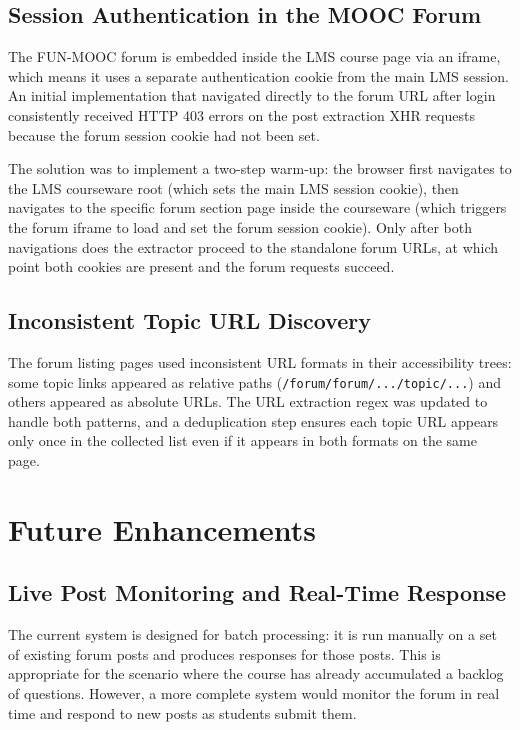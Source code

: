 \documentclass[12pt, a4paper]{article}
\begin{document}
\subsection{Session Authentication in the MOOC Forum}

The FUN-MOOC forum is embedded inside the LMS course page via an iframe, which means it uses a separate authentication cookie from the main LMS session. An initial implementation that navigated directly to the forum URL after login consistently received HTTP 403 errors on the post extraction XHR requests because the forum session cookie had not been set.

The solution was to implement a two-step warm-up: the browser first navigates to the LMS courseware root (which sets the main LMS session cookie), then navigates to the specific forum section page inside the courseware (which triggers the forum iframe to load and set the forum session cookie). Only after both navigations does the extractor proceed to the standalone forum URLs, at which point both cookies are present and the forum requests succeed.

\subsection{Inconsistent Topic URL Discovery}

The forum listing pages used inconsistent URL formats in their accessibility trees: some topic links appeared as relative paths (\texttt{/forum/forum/.../topic/...}) and others appeared as absolute URLs. The URL extraction regex was updated to handle both patterns, and a deduplication step ensures each topic URL appears only once in the collected list even if it appears in both formats on the same page.

\section{Future Enhancements}

\subsection{Live Post Monitoring and Real-Time Response}

The current system is designed for batch processing: it is run manually on a set of existing forum posts and produces responses for those posts. This is appropriate for the scenario where the course has already accumulated a backlog of questions. However, a more complete system would monitor the forum in real time and respond to new posts as students submit them.
\end{document}
